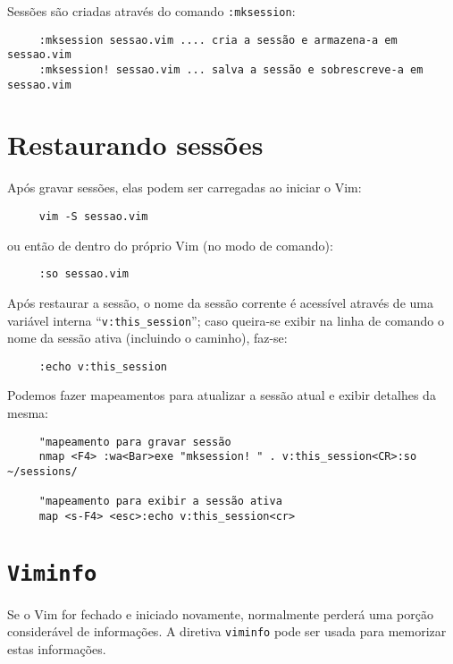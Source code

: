 Sessões são criadas através do comando \verb|:mksession|:

\begin{verbatim}
     :mksession sessao.vim .... cria a sessão e armazena-a em sessao.vim
     :mksession! sessao.vim ... salva a sessão e sobrescreve-a em sessao.vim
\end{verbatim}

\section{Restaurando sessões}

Após gravar sessões, elas podem ser carregadas ao iniciar o Vim:

\begin{verbatim}
     vim -S sessao.vim
\end{verbatim}

ou então de dentro do próprio Vim (no modo de comando):

\begin{verbatim}
     :so sessao.vim
\end{verbatim}

Após restaurar a sessão, o nome da sessão corrente é acessível através de uma
variável interna ``\verb+v:this_session+''; caso queira-se exibir na linha de
comando o nome da sessão ativa (incluindo o caminho), faz-se:

\begin{verbatim}
     :echo v:this_session
\end{verbatim}

Podemos fazer mapeamentos para atualizar a sessão atual e exibir detalhes da
mesma:

\begin{verbatim}
     "mapeamento para gravar sessão
     nmap <F4> :wa<Bar>exe "mksession! " . v:this_session<CR>:so ~/sessions/

     "mapeamento para exibir a sessão ativa
     map <s-F4> <esc>:echo v:this_session<cr>
\end{verbatim}

\section{{\tt Viminfo}}\label{sec:Viminfo}

Se o Vim for fechado e iniciado novamente, normalmente perderá uma porção
considerável de informações. A diretiva {\tt viminfo} pode ser usada para
memorizar estas informações.

